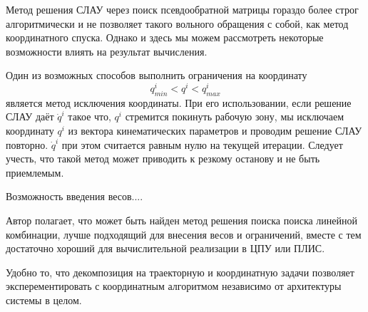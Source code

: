 Метод решения СЛАУ через поиск псевдообратной матрицы гораздо более строг алгоритмически и не позволяет такого вольного обращения с собой, как метод координатного спуска. Однако и здесь мы можем рассмотреть некоторые возможности влиять на результат вычисления.

Один из возможных способов выполнить ограничения на координату
\begin{equation}
q^i_{min} < q^i < q^i_{max} 
\end{equation} является метод исключения координаты. При его использовании, если решение СЛАУ даёт $\dot{q}^i$ такое что, $q^i$ стремится покинуть рабочую зону, мы исключаем координату $q^i$ из вектора кинематических параметров и проводим решение СЛАУ повторно. $\dot{q}^i$ при этом считается равным нулю на текущей итерации. Следует учесть, что такой метод может приводить к резкому останову и не быть приемлемым.

Возможность введения весов....

Автор полагает, что может быть найден метод решения поиска поиска линейной комбинации, лучше подходящий для внесения весов и ограничений, вместе с тем достаточно хороший для вычислительной реализации в ЦПУ или ПЛИС. 

Удобно то, что декомпозиция на траекторную и координатную задачи позволяет эксперементировать с координатным алгоритмом независимо от архитектуры системы в целом.